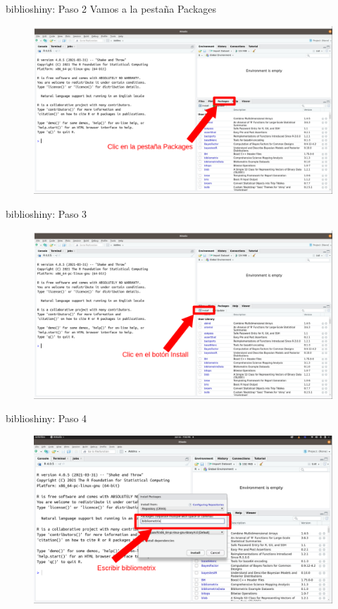 \documentclass{beamer}
\begin{document}
\begin{frame}{biblioshiny: Paso 2}
Vamos a la pestaña Packages
\begin{figure}
\centering
\includegraphics[width=.92\textwidth]{Paso1.png}
\end{figure}  
\end{frame}

\begin{frame}{biblioshiny: Paso 3}
\begin{figure}
\centering
\includegraphics[width=.92\textwidth]{Paso2.png}
\end{figure}  
\end{frame}

\begin{frame}{biblioshiny: Paso 4}
\begin{figure}
\centering
\includegraphics[width=.92\textwidth]{Paso3.png}
\end{figure}  
\end{frame}
\end{document}
